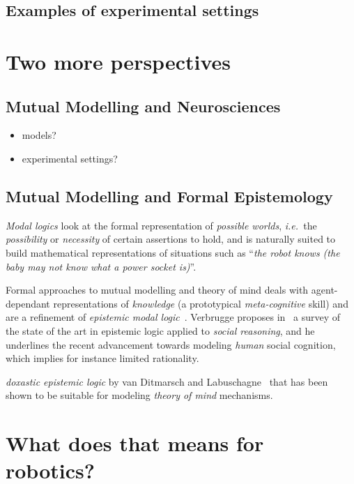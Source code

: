 \documentclass{sig-alternate}
\newcommand{\ie}{{\textit{i.e.~}}}
\begin{document}
\subsection{Examples of experimental settings}

\section{Two more perspectives}

\subsection{Mutual Modelling and Neurosciences}

\begin{itemize}
    \item models?
    \item experimental settings?
\end{itemize}


\subsection{Mutual Modelling and Formal Epistemology}
\label{formal-epistemology}

\emph{Modal logics} look at the formal representation of \emph{possible
worlds}, \ie the \emph{possibility} or \emph{necessity} of certain assertions
to hold, and is naturally suited to build mathematical representations of
situations such as ``\emph{the robot knows (the baby may not know what a power
socket is)}''.

Formal approaches to mutual modelling and theory of mind deals with
agent-dependant representations of \emph{knowledge} (a prototypical
\emph{meta-cognitive} skill) and are a refinement of \emph{epistemic modal
logic}~\cite{hendricks2008epistemic}. Verbrugge proposes
in~\cite{verbrugge2009logic} a survey of the state of the art in epistemic logic
applied to \emph{social reasoning}, and he underlines the recent advancement
towards modeling \emph{human} social cognition, which implies for instance
limited rationality.


\emph{doxastic epistemic logic} by van Ditmarsch and
Labuschagne~\cite{vanditmarsch2007beliefs} that has been shown to be suitable
for modeling \emph{theory of mind} mechanisms.

\section{What does that means for robotics?}
\end{document}
